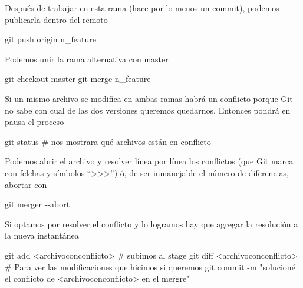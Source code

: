 \documentclass[
  letterpaper,
  DIV=11,
  numbers=noendperiod]{scrartcl}
\newenvironment{Shaded}{\begin{snugshade}}{\end{snugshade}}
\newcommand{\CommentTok}[1]{\textcolor[rgb]{0.37,0.37,0.37}{#1}}
\newcommand{\FunctionTok}[1]{\textcolor[rgb]{0.28,0.35,0.67}{#1}}
\newcommand{\NormalTok}[1]{\textcolor[rgb]{0.00,0.23,0.31}{#1}}
\newcommand{\OperatorTok}[1]{\textcolor[rgb]{0.37,0.37,0.37}{#1}}
\newcommand{\StringTok}[1]{\textcolor[rgb]{0.13,0.47,0.30}{#1}}
\begin{document}
Después de trabajar en esta rama (hace por lo menos un commit), podemos
publicarla dentro del remoto

\begin{Shaded}
\begin{Highlighting}[]
\NormalTok{git push origin n\_feature}
\end{Highlighting}
\end{Shaded}

Podemos unir la rama alternativa con master

\begin{Shaded}
\begin{Highlighting}[]
\NormalTok{git checkout master}
\NormalTok{git merge n\_feature}
\end{Highlighting}
\end{Shaded}

Si un mismo archivo se modifica en ambas ramas habrá un conflicto porque
Git no sabe con cual de las dos versiones queremos quedarnos. Entonces
pondrá en pausa el proceso

\begin{Shaded}
\begin{Highlighting}[]
\NormalTok{git status }\CommentTok{\# nos mostrara qué archivos están en conflicto}
\end{Highlighting}
\end{Shaded}

Podemos abrir el archivo y resolver línea por línea los conflictos (que
Git marca con felchas y símbolos
``\textgreater\textgreater\textgreater{}'') ó, de ser inmanejable el
número de diferencias, abortar con

\begin{Shaded}
\begin{Highlighting}[]
\NormalTok{git merger }\OperatorTok{{-}{-}}\NormalTok{abort}
\end{Highlighting}
\end{Shaded}

Si optamos por resolver el conflicto y lo logramos hay que agregar la
resolución a la nueva instantánea

\begin{Shaded}
\begin{Highlighting}[]
\NormalTok{git add }\OperatorTok{\textless{}}\NormalTok{archivoconconflicto}\OperatorTok{\textgreater{}} \CommentTok{\# subimos al stage}
\NormalTok{git }\FunctionTok{diff} \OperatorTok{\textless{}}\NormalTok{archivoconconflicto}\OperatorTok{\textgreater{}} \CommentTok{\# Para ver las modificaciones que hicimos si queremos}
\NormalTok{git commit }\OperatorTok{{-}}\NormalTok{m }\StringTok{"solucioné el conflicto de \textless{}archivoconconflicto\textgreater{} en el mergre"}
\end{Highlighting}
\end{Shaded}
\end{document}
